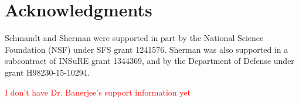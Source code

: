 \section{Acknowledgments}


Schmandt and Sherman were supported in part by the National Science Foundation (NSF) 
under SFS grant 1241576. 
Sherman was also supported in a subcontract of INSuRE grant 1344369, 
and by the Department of Defense under grant H98230-15-10294.

\textcolor{red}{I don't have Dr. Banerjee's support information yet}